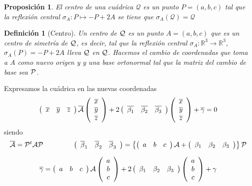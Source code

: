 \documentclass[11pt, a4paper, titlepage]{article}
\theoremstyle{theorem-style}
\newtheorem*{nprop}{Proposición}
\theoremstyle{definition-style}
\newtheorem*{ndef}{Definición}
\theoremstyle{remark-style}
\theoremstyle{example-style}
\begin{document}
\begin{nprop}
	El centro de una cuádrica $\mathcal Q$ es un punto $P=(a,b,c)$ tal que la reflexión central $\sigma_A: P \mapsto -P+2A$ se tiene que $\sigma_A (\mathcal Q) = \mathcal Q$
\end{nprop}


\begin{ndef}[Centro]
	Un {\it centro} de $\cal Q$ es un punto $A=(a,b,c)$ que es un centro de simetr\'ia de $\cal Q$, es decir, tal que la reflexi\'on central $\sigma_A:\mathbb{R}^3\longrightarrow\mathbb{R}^3$, $\sigma_A(P)= -P+2A$ lleva  $\cal Q$ en $\cal Q$. Hacemos el cambio de coordenadas que toma a $A$ como nuevo origen y 
y una base ortonormal tal que la matriz del cambio de base sea $\cal P$.
\end{ndef}


Expresamos la cu\'adrica en las nuevas coordenadas
\[ 
\left( \begin{array}{ccc} 
\overline{x} & \overline{y} & \overline{z}   
 \end{array} \right)\overline{{\cal A}}
\left(\begin{array}{c}
\overline{x} \\
\overline{y} \\
\overline{z}  
\end{array} \right)
+
2
 \left( \begin{array}{ccc}
\overline{\beta_1} & \overline{\beta_2} & \overline{\beta_3}   
 \end{array} \right)
\left( \begin{array}{c}
\overline{x} \\
\overline{y} \\
\overline{z}  
 \end{array} \right)
+ \overline{\gamma} = 0
\]
siendo
\[
\overline{{\cal A}} = {\cal P}^t{\cal A}{\cal P} \hspace{1.5cm}
\left( \begin{array}{ccc}
\overline{\beta}_1 & \overline{\beta}_2 & \overline{\beta}_3   
 \end{array} \right) = 
  \left\{
\left( \begin{array}{ccc} 
a &  b &  c 
 \end{array} \right){\cal A} +
 \left( \begin{array}{ccc}
\beta_1 & \beta_2 & \beta_3   
 \end{array} \right) \right\}
{\cal P}
\]


\[
 \overline{\gamma} = \left( \begin{array}{ccc} 
a &  b & c 
 \end{array} \right){\cal A}
\left(\begin{array}{c}
a  \\
b \\
c  
\end{array} \right)  + 
2 \left( \begin{array}{ccc}
\beta_1 & \beta_2 & \beta_3   
 \end{array} \right)
\left( \begin{array}{c}
a \\
b \\
c  
 \end{array} \right)
+ \gamma
\]
\end{document}
